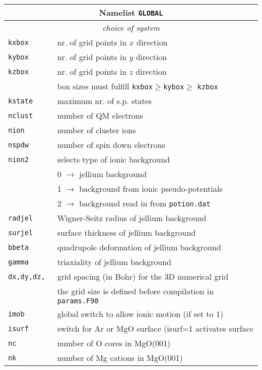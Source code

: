 \documentclass[12pt]{article}
\begin{document}
\newpage

\begin{tabular}{ll}
\hline
\multicolumn{2}{c}{Namelist {\tt GLOBAL}} in {\tt for005.<name>} \\
\hline
\multicolumn{2}{c}{\it choice of system} \\
\hline
{\tt kxbox            }& nr. of grid points in $x$ direction\\
{\tt kybox            }& nr. of grid points in $y$ direction\\
{\tt kzbox            }& nr. of grid points in $z$ direction\\
& box sizes must fulfill {\tt kxbox}$\geq${\tt kybox}$\geq$ {\tt kzbox}\\
{\tt kstate           }& maximum nr. of s.p. states\\
{\tt nclust           }& number of QM electrons\\
{\tt nion             }& number of cluster ions\\
{\tt nspdw            }& number of spin down electrons \\
{\tt nion2            }& selects type of ionic background \\
                       &  0 $\rightarrow$ jellium background \\
                       &  1 $\rightarrow$ background from ionic pseudo-potentials\\
                       &  2 $\rightarrow$ background read in from {\tt potion.dat}\\
{\tt radjel           }& Wigner-Seitz radius of jellium background\\
{\tt surjel         }& surface thickness of jellium background\\
{\tt bbeta         }& quadrupole deformation of jellium background\\
{\tt gamma         }& triaxiality of jellium background\\
{\tt dx,dy,dz,        }& grid spacing (in  Bohr) for the 3D numerical grid\\
&the grid size is defined before compilation in {\tt params.F90}\\
{\tt imob          }& global switch to allow ionic motion (if set to 1) \\
{\tt isurf            }& switch for Ar or MgO surface (isurf=1 activates
          surface\\
{\tt nc               }& number of O cores in MgO(001)\\
{\tt nk               }& number of Mg cations in MgO(001)\\

\end{tabular}
\end{document}
